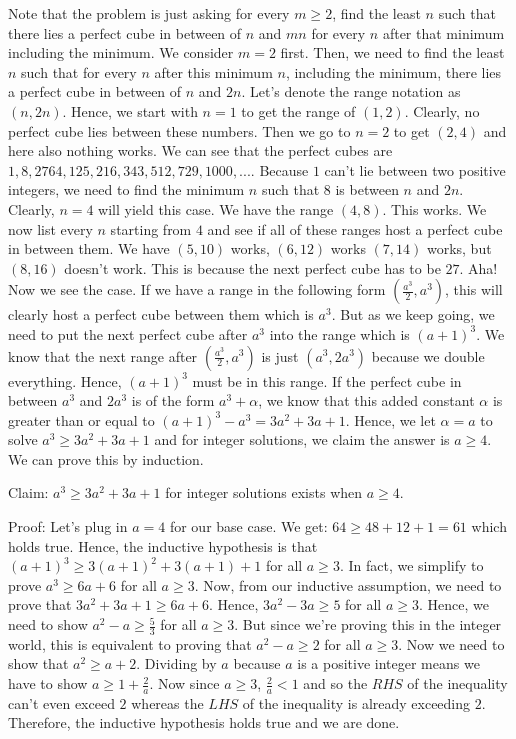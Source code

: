 \begin{enumerate}
Note that the problem is just asking for every $m \geq 2$, find the least $n$ such that there lies a perfect cube in between of $n$ and $mn$ for every $n$ after that minimum including the minimum. We consider $m = 2$ first. Then, we need to find the least $n$ such that for every $n$ after this minimum $n$, including the minimum, there lies a perfect cube in between of $n$ and $2n$. Let's denote the range notation as $(n, 2n)$. Hence, we start with $n = 1$ to get the range of $(1, 2)$. Clearly, no perfect cube lies between these numbers. Then we go to $n = 2$ to get $(2, 4)$ and here also nothing works. We can see that the perfect cubes are $1, 8, 27 64, 125, 216, 343, 512, 729, 1000, ...$. Because $1$ can't lie between two positive integers, we need to find the minimum $n$ such that $8$ is between $n$ and $2n$. Clearly, $n = 4$ will yield this case. We have the range $(4, 8)$. This works. We now list every $n$ starting from $4$ and see if all of these ranges host a perfect cube in between them. We have $(5, 10)$ works, $(6, 12)$ works $(7, 14)$ works, but $(8, 16)$ doesn't work. This is because the next perfect cube has to be $27$. Aha! Now we see the case. If we have a range in the following form $(\frac{a^{3}}{2}, a^{3})$, this will clearly host a perfect cube between them which is $a^{3}$. But as we keep going, we need to put the next perfect cube after $a^{3}$ into the range which is $(a + 1)^{3}$. We know that the next range after $(\frac{a^{3}}{2}, a^{3})$ is just $(a^{3}, 2a^{3})$ because we double everything. Hence, $(a + 1)^{3}$ must be in this range. If the perfect cube in between $a^{3}$ and $2a^{3}$ is of the form $a^{3} + \alpha$, we know that this added constant $\alpha$ is greater than or equal to $(a + 1)^{3} - a^{3} = 3a^{2} + 3a + 1$. Hence, we let $\alpha = a$ to solve $a^{3} \geq 3a^{2} + 3a + 1$ and for integer solutions, we claim the answer is $a \geq 4$. We can prove this by induction.

 Claim: $a^{3} \geq 3a^{2} + 3a + 1$ for integer solutions exists when $a \geq 4$.

 Proof: Let's plug in $a = 4$ for our base case. We get: $64 \geq 48 + 12 + 1 = 61$ which holds true. Hence, the inductive hypothesis is that $(a + 1)^{3} \geq 3(a + 1)^{2} + 3(a + 1) + 1$ for all $a \geq 3$. In fact, we simplify to prove $a^{3} \geq 6a + 6$ for all $a \geq 3$. Now, from our inductive assumption, we need to prove that $3a^{2} + 3a + 1 \geq 6a + 6$. Hence, $3a^{2} - 3a \geq 5$ for all $a \geq 3$. Hence, we need to show $a^{2} - a \geq \frac{5}{3}$ for all $a \geq 3$. But since we're proving this in the integer world, this is equivalent to proving that $a^{2} -a \geq 2$ for all $a \geq 3$. Now we need to show that $a^{2} \geq a + 2$. Dividing by $a$ because $a$ is a positive integer means we have to show $a \geq 1 + \frac{2}{a}$. Now since $a \geq 3$, $\frac{2}{a} < 1$ and so the $RHS$ of the inequality can't even exceed $2$ whereas the $LHS$ of the inequality is already exceeding $2$. Therefore, the inductive hypothesis holds true and we are done.


\end{enumerate}
